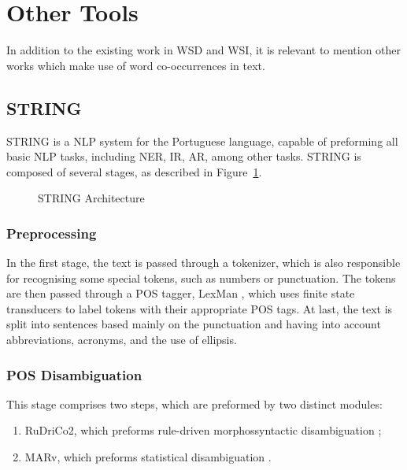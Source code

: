 \section{Other Tools}

In addition to the existing work in \ac{WSD} and \ac{WSI}, it is relevant to
mention other works which make use of word co-occurrences in text.

\subsection{STRING}
\label{sec:string}

\ac{STRING} \citep{mamede2012string} is a \ac{NLP} system for the Portuguese
language, capable of preforming all basic \ac{NLP} tasks, including \ac{NER},
\ac{IR}, \ac{AR}, among other tasks. \ac{STRING} is composed of several stages,
as described in Figure~\ref{fig:stringarch}.

\begin{figure}[ht]
 \caption{\acs*{STRING} Architecture}
 \label{fig:stringarch}
 \centering
 
\end{figure}

\subsubsection*{Preprocessing}

In the first stage, the text is passed through a tokenizer, which is also
responsible for recognising some special tokens, such as numbers or punctuation.
The tokens are then passed through a \ac{POS} tagger, LexMan
\citep{vicente2013lexman}, which uses finite state transducers to label tokens
with their appropriate \ac{POS} tags. At last, the text is split into sentences
based mainly on the punctuation and having into account abbreviations, acronyms,
and the use of ellipsis.

\subsubsection*{POS Disambiguation}

This stage comprises two steps, which are preformed by two distinct modules:

\begin{enumerate}
 \item \ac{RuDriCo2}, which preforms rule-driven morphossyntactic disambiguation
\citep{diniz2010conversor};
 \item \ac{MARv}, which preforms statistical disambiguation
\citep{ribeiro2003anotacao}.
\end{enumerate}

